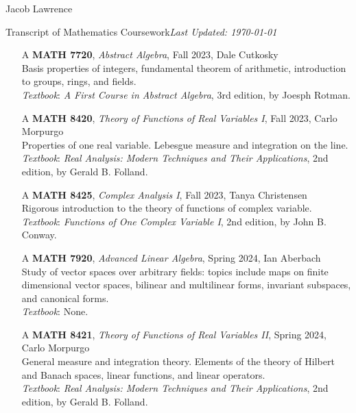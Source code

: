\documentclass{article}
\begin{document}
\huge Jacob Lawrence

\large Transcript of Mathematics Coursework\hfill \normalsize \textit{Last Updated: \today}

\begin{enumerate}
    \item[A] \textbf{MATH 7720}, \textit{Abstract Algebra}, Fall 2023, Dale Cutkosky \\ 
    Basis properties of integers, fundamental theorem of arithmetic, introduction to groups, rings, and fields.\\
    \textit{Textbook}: \textit{A First Course in Abstract Algebra}, 3rd edition, by Joesph Rotman.  

    \item[A] \textbf{MATH 8420}, \textit{Theory of Functions of Real Variables I}, Fall 2023, Carlo Morpurgo\\
    Properties of one real variable. Lebesgue measure and integration on the line. \\
    \textit{Textbook}: \textit{Real Analysis: Modern Techniques and Their Applications}, 2nd edition, by Gerald B. Folland. 

    \item[A] \textbf{MATH 8425}, \textit{Complex Analysis I}, Fall 2023, Tanya Christensen\\
    Rigorous introduction to the theory of functions of complex variable. \\
    \textit{Textbook}: \textit{Functions of One Complex Variable I}, 2nd edition, by John B. Conway. 
    
    \item[A] \textbf{MATH 7920}, \textit{Advanced Linear Algebra}, Spring 2024, Ian Aberbach\\
    Study of vector spaces over arbitrary fields: topics include maps on finite dimensional vector spaces, bilinear and multilinear forms, invariant subspaces, and canonical forms. \\
    \textit{Textbook}: None.  

    \item[A] \textbf{MATH 8421}, \textit{Theory of Functions of Real Variables II}, Spring 2024, Carlo Morpurgo \\
    General measure and integration theory. Elements of the theory of Hilbert and Banach spaces, linear functions, and linear operators. \\
    \textit{Textbook}: \textit{Real Analysis: Modern Techniques and Their Applications}, 2nd edition, by Gerald B. Folland. 


\end{enumerate}
\end{document}
